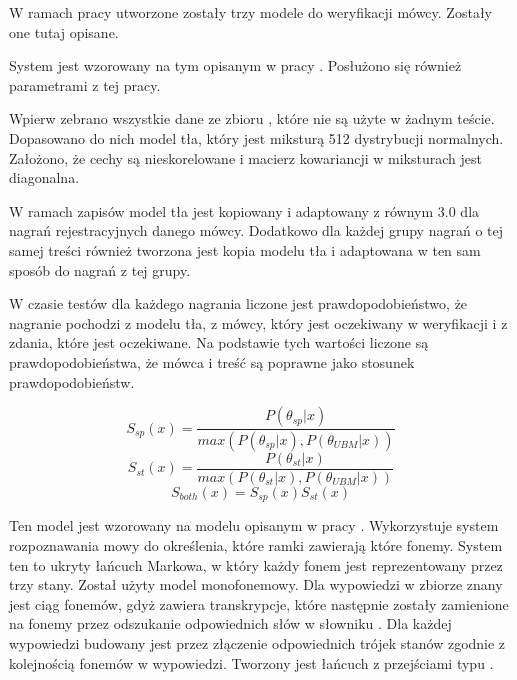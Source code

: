 W ramach pracy utworzone zostały trzy modele do weryfikacji mówcy. Zostały one tutaj opisane.

\label{sec:gmm_ubm}

System  jest wzorowany na tym opisanym w pracy \cite{utteranceVerificationFor}. Posłużono
się również parametrami z tej pracy.

Wpierw zebrano wszystkie dane ze zbioru , które nie są użyte w żadnym teście. Dopasowano
do nich model tła, który jest miksturą 512 dystrybucji normalnych. Założono, że cechy są nieskorelowane
i macierz kowariancji w miksturach jest diagonalna.

W ramach zapisów model tła jest kopiowany i  adaptowany z  równym $3.0$
dla nagrań rejestracyjnych danego mówcy. Dodatkowo dla każdej grupy nagrań o tej samej treści również tworzona
jest kopia modelu tła i  adaptowana w ten sam sposób do nagrań z tej grupy.

W czasie testów dla każdego nagrania liczone jest prawdopodobieństwo, że nagranie pochodzi z modelu tła,
z  mówcy, który jest oczekiwany w weryfikacji i z  zdania, które jest oczekiwane.
Na podstawie tych wartości liczone są prawdopodobieństwa, że mówca i treść są poprawne jako stosunek prawdopodobieństw.

$$S_{sp}(x) = \frac{P(\theta_{sp} | x)}{max(P(\theta_{sp} | x), P(\theta_{UBM} | x))}$$
$$S_{st}(x) = \frac{P(\theta_{st} | x)}{max(P(\theta_{st} | x), P(\theta_{UBM} | x))}$$
$$S_{both}(x) = S_{sp}(x) S_{st}(x)$$

\label{sec:hmm_gmm}

Ten model jest wzorowany na modelu opisanym w pracy \cite{comparisonOfMultiple}. Wykorzystuje
system rozpoznawania mowy do określenia, które ramki zawierają które fonemy. System ten
to ukryty łańcuch Markowa, w który każdy fonem jest reprezentowany przez trzy stany. Został
użyty model monofonemowy. Dla wypowiedzi w zbiorze znany jest ciąg fonemów, gdyż
 zawiera transkrypcje, które następnie zostały zamienione na fonemy
przez odszukanie odpowiednich słów w słowniku . Dla każdej wypowiedzi
budowany jest  przez złączenie odpowiednich trójek stanów zgodnie z kolejnością
fonemów w wypowiedzi. Tworzony jest łańcuch z przejściami typu .

